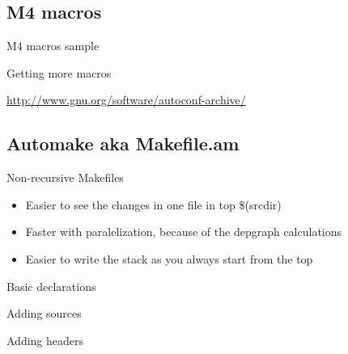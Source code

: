 \documentclass{beamer}
\begin{document}
\subsection{M4 macros}

\begin{frame}[t]{M4 macros sample}
    \begin{small}
    
    \end{small}
\end{frame}

\begin{frame}{Getting more macros}
    \begin{center}\url{http://www.gnu.org/software/autoconf-archive/}\end{center}
\end{frame}

\subsection{Automake aka Makefile.am}

\begin{frame}[t]{Non-recursive Makefiles}
    \begin{itemize}
    \item Easier to see the changes in one file in top \$(srcdir)
    \item Faster with paralelization, because of the depgraph calculations
    \item Easier to write the stack as you always start from the top
    \end{itemize}
\end{frame}

\begin{frame}[t]{Basic declarations}
    \begin{small}
    
    \end{small}
\end{frame}

\begin{frame}[t]{Adding sources}
    \begin{small}
    
    \end{small}
\end{frame}

\begin{frame}[t]{Adding headers}
    \begin{small}
    
    \end{small}
\end{frame}
\end{document}
